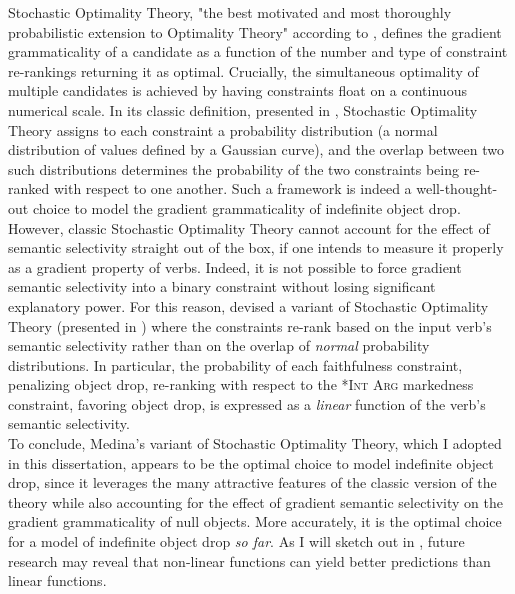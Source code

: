Stochastic Optimality Theory, "the best motivated and most thoroughly probabilistic extension to Optimality Theory" according to \textcite[25]{manning2003probabilistic}, defines the gradient grammaticality of a candidate as a function of the number and type of constraint re-rankings returning it as optimal. Crucially, the simultaneous optimality of multiple candidates is achieved by having constraints float on a continuous numerical scale. In its classic definition, presented in , Stochastic Optimality Theory assigns to each constraint a probability distribution (a normal distribution of values defined by a Gaussian curve), and the overlap between two such distributions determines the probability of the two constraints being re-ranked with respect to one another. Such a framework is indeed a well-thought-out choice to model the gradient grammaticality of indefinite object drop. However, classic Stochastic Optimality Theory cannot account for the effect of semantic selectivity straight out of the box, if one intends to measure it properly as a gradient property of verbs. Indeed, it is not possible to force gradient semantic selectivity into a binary constraint without losing significant explanatory power. For this reason, \textcite{Medina2007} devised a variant of Stochastic Optimality Theory (presented in ) where the constraints re-rank based on the input verb's semantic selectivity rather than on the overlap of \textit{normal} probability distributions. In particular, the probability of each faithfulness constraint, penalizing object drop, re-ranking with respect to the \textsc{*Int Arg} markedness constraint, favoring object drop, is expressed as a \textit{linear} function of the verb's semantic selectivity.\\
To conclude, Medina's variant of Stochastic Optimality Theory, which I adopted in this dissertation, appears to be the optimal choice to model indefinite object drop, since it leverages the many attractive features of the classic version of the theory while also accounting for the effect of gradient semantic selectivity on the gradient grammaticality of null objects. More accurately, it is the optimal choice for a model of indefinite object drop \textit{so far}. As I will sketch out in , future research may reveal that non-linear functions can yield better predictions than linear functions.

